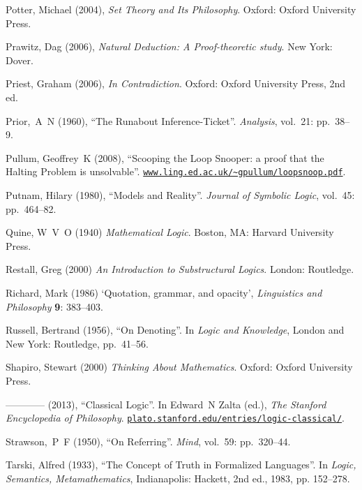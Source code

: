 \documentclass[openany,leqno,11pt]{book}
\theoremstyle{break}
\theoremstyle{definition}
\theoremstyle{remark}
\begin{document}
{\begin{thebibliography}{39}
Potter, Michael (2004), \emph{Set Theory and Its Philosophy}. Oxford: Oxford
  University Press.

Prawitz, Dag (2006), \emph{Natural Deduction: A Proof-theoretic study}. New
  York: Dover.

Priest, Graham (2006), \emph{In Contradiction}. Oxford: Oxford University
  Press, 2nd ed.

Prior,~A~N (1960), \enquote{The Runabout Inference-Ticket}. \emph{Analysis},
  vol.~21: pp.~38–9.

Pullum, Geoffrey~K (2008), \enquote{Scooping the Loop Snooper: a proof that
  the Halting Problem is unsolvable}.
  \urlprefix\href{http://www.ling.ed.ac.uk/~gpullum/loopsnoop.pdf}{\nolinkurl{www.ling.ed.ac.uk/~gpullum/loopsnoop.pdf}}.

Putnam, Hilary (1980), \enquote{Models and Reality}. \emph{Journal of Symbolic
  Logic}, vol.~45: pp.~464–82.

 Quine, W~V~O (1940) \emph{Mathematical Logic}. Boston, MA: Harvard University Press.

Restall, Greg (2000) \emph{An Introduction to Substructural Logics}. London: Routledge.

 Richard, Mark (1986) `Quotation, grammar, and opacity', \emph{Linguistics and Philosophy} \textbf{9}: 383–403.

Russell, Bertrand (1956), \enquote{On Denoting}. In \emph{Logic and
  Knowledge}, London and New York: Routledge, pp.~41–56.

 Shapiro, Stewart (2000) \emph{Thinking About Mathematics}. Oxford: Oxford University Press.

---\!\!---\!\!---\!\!---  (2013), \enquote{Classical Logic}. In Edward~N Zalta (ed.),
  \emph{The Stanford Encyclopedia of Philosophy}. \urlprefix\href{http://plato.stanford.edu/entries/logic-classical/}{\nolinkurl{plato.stanford.edu/entries/logic-classical/}}.

Strawson,~P~F (1950), \enquote{On Referring}. \emph{Mind}, vol.~59:
  pp.~320–44.

Tarski, Alfred (1933), \enquote{The Concept of Truth in Formalized Languages}. 
  In \emph{Logic, Semantics, Metamathematics}, Indianapolis: Hackett, 2nd ed., 1983, pp.
  152–278.


\end{thebibliography}}
\end{document}
